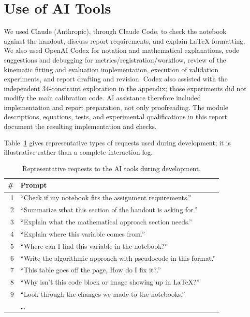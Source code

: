 \documentclass[11pt]{article}
\begin{document}
\section{Use of AI Tools}

We used Claude (Anthropic), through Claude Code, to check the notebook against the handout, discuss report requirements, and explain LaTeX formatting. We also used OpenAI Codex for notation and mathematical explanations, code suggestions and debugging for metrics/registration/workflow, review of the kinematic fitting and evaluation implementation, execution of validation experiments, and report drafting and revision. Codex also assisted with the independent 34-constraint exploration in the appendix; those experiments did not modify the main calibration code. AI assistance therefore included implementation and report preparation, not only proofreading. The module descriptions, equations, tests, and experimental qualifications in this report document the resulting implementation and checks.

Table~\ref{tab:prompts} gives representative types of requests used during development; it is illustrative rather than a complete interaction log.

\begin{table}[H]
\centering
\small
\caption{Representative requests to the AI tools during development.}
\label{tab:prompts}
\begin{tabular}{@{}rp{}@{}}
\toprule
\# & Prompt \\
\midrule
1  & ``Check if my notebook fits the assignment requirements.'' \\
2  & ``Summarize what this section of the handout is asking for.'' \\
3  & ``Explain what the mathematical approach section needs.'' \\
4  & ``Explain where this variable comes from.'' \\
5  & ``Where can I find this variable in the notebook?'' \\
6 & ``Write the algorithmic approach with pseudocode in this format.'' \\
7 & ``This table goes off the page, How do I fix it?.'' \\
8 & ``Why isn't this code block or image showing up in LaTeX?'' \\
9 & ``Look through the changes we made to the notebooks.'' \\
   & \dots \\
\bottomrule
\end{tabular}
\end{table}
\end{document}
